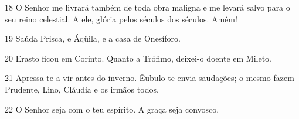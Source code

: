 \par 18 O Senhor me livrará também de toda obra maligna e me levará salvo para o seu reino celestial. A ele, glória pelos séculos dos séculos. Amém!
\par 19 Saúda Prisca, e Áqüila, e a casa de Onesíforo.
\par 20 Erasto ficou em Corinto. Quanto a Trófimo, deixei-o doente em Mileto.
\par 21 Apressa-te a vir antes do inverno. Êubulo te envia saudações; o mesmo fazem Prudente, Lino, Cláudia e os irmãos todos.
\par 22 O Senhor seja com o teu espírito. A graça seja convosco.


